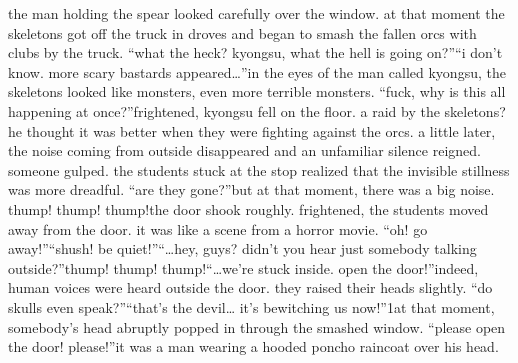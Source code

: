 the man holding the spear looked carefully over the window.
 at that moment the skeletons got off the truck in droves and began to smash the fallen orcs with clubs by the truck.
“what the heck? kyongsu, what the hell is going on?”“i don’t know.
 more scary bastards appeared…”in the eyes of the man called kyongsu, the skeletons looked like monsters, even more terrible monsters.
“fuck, why is this all happening at once?”frightened, kyongsu fell on the floor.
 a raid by the skeletons? he thought it was better when they were fighting against the orcs.
a little later, the noise coming from outside disappeared and an unfamiliar silence reigned.
 someone gulped.
 the students stuck at the stop realized that the invisible stillness was more dreadful.
“are they gone?”but at that moment, there was a big noise.
thump! thump! thump!the door shook roughly.
 frightened, the students moved away from the door.
 it was like a scene from a horror movie.
“oh! go away!”“shush! be quiet!”“…hey, guys? didn’t you hear just somebody talking outside?”thump! thump! thump!“…we’re stuck inside.
 open the door!”indeed, human voices were heard outside the door.
 they raised their heads slightly.
“do skulls even speak?”“that’s the devil… it’s bewitching us now!”1at that moment, somebody’s head abruptly popped in through the smashed window.
“please open the door! please!”it was a man wearing a hooded poncho raincoat over his head.


 